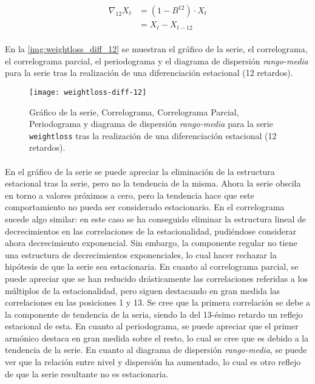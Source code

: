 \documentclass[a4paper, spanish]{article}
\begin{document}
        \begin{equation}
        \label{eq:diff_12}
          \begin{split}
            \nabla_{12} X_t
            &= (1 - B^12) \cdot X_t \\
            &= X_t - X_{t - 12}
          \end{split}
        \end{equation}

        \paragraph{}
        En la \autoref{img:weightloss_diff_12} se muestran el gráfico de la serie, el correlograma, el correlograma parcial, el periodograma y el diagrama de dispersión \emph{rango-media} para la serie tras la realización de una diferenciación estacional (12 retardos).

        \begin{figure}[htb!]
          \centering
          \texttt{[image: weightloss-diff-12]}
          \caption{Gráfico de la serie, Correlograma, Correlograma Parcial, Periodograma y diagrama de dispersión \emph{rango-media} para la serie \texttt{weightloss} tras la realización de una diferenciación estacional (12 retardos).}
          \label{img:weightloss_diff_12}
        \end{figure}

        \paragraph{}
        En el gráfico de la serie se puede apreciar la eliminación de la estructura estacional tras la serie, pero no la tendencia de la misma. Ahora la serie obscila en torno a valores próximos a cero, pero la tendencia hace que este comportamiento no pueda ser considerado estacionario. En el correlograma sucede algo similar: en este caso se ha conseguido eliminar la estructura lineal de decrecimientos en las correlaciones de la estacionalidad, pudiéndose considerar ahora decrecimiento exponencial. Sin embargo, la componente regular no tiene una estructura de decrecimientos exponenciales, lo cual hacer rechazar la hipótesis de que la serie sea estacionaria. En cuanto al correlograma parcial, se puede apreciar que se han reducido drásticamente las correlaciones referidas a los múltiplos de la estacionalidad, pero siguen destacando en gran medida las correlaciones en las posiciones 1 y 13. Se cree que la primera correlación se debe a la componente de tendencia de la seria, siendo la del 13-ésimo retardo un reflejo estacional de esta. En cuanto al periodograma, se puede apreciar que el primer armónico destaca en gran medida sobre el resto, lo cual se cree que es debido a la tendencia de la serie. En cuanto al diagrama de dispersión \emph{rango-media}, se puede ver que la relación entre nivel y dispersión ha aumentado, lo cual es otro reflejo de que la serie resultante no es estacionaria.
\end{document}
